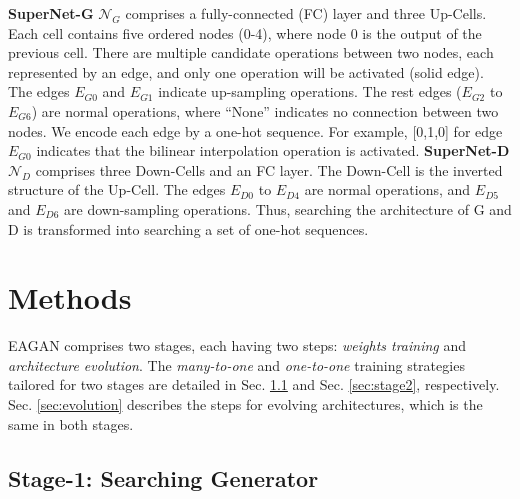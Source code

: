 \documentclass[runningheads]{llncs}
\begin{document}
\textbf{SuperNet-G} $\mathcal{N}_G$ comprises a fully-connected (FC) layer and three Up-Cells. Each cell contains five ordered nodes (0-4), where node 0 is the output of the previous cell. There are multiple candidate operations between two nodes, each represented by an edge, and only one operation will be activated (solid edge). The edges $E_{G0}$ and $E_{G1}$ indicate up-sampling operations. The rest edges ($E_{G2}$ to $E_{G6}$) are normal operations, where ``None'' indicates no connection between two nodes. We encode each edge by a one-hot sequence. For example, [0,1,0] for edge $E_{G0}$ indicates that the bilinear interpolation operation is activated. \textbf{SuperNet-D} $\mathcal{N}_D$ comprises three Down-Cells and an FC layer. The Down-Cell is the inverted structure of the Up-Cell. The edges $E_{D0}$ to $E_{D4}$ are normal operations, and $E_{D5}$ and $E_{D6}$ are down-sampling operations. Thus, searching the architecture of G and D is transformed into searching a set of one-hot sequences. 



\section{Methods}












EAGAN comprises two stages, each having two steps: \textit{weights training} and \textit{architecture evolution}. The \textit{many-to-one} and \textit{one-to-one} training strategies tailored for two stages are detailed in Sec. \ref{sec:stage1} and Sec. \ref{sec:stage2}, respectively. Sec. \ref{sec:evolution} describes the steps for evolving architectures, which is the same in both stages.






\subsection{Stage-1: Searching Generator}\label{sec:stage1}
\end{document}
